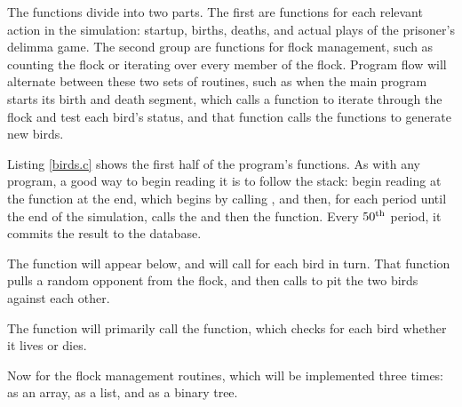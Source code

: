 The functions divide into two parts. The first are functions for
each relevant action in the simulation: startup, births, deaths, and
actual plays of the prisoner's delimma game. The second group are
functions for flock management, such as counting the flock or iterating
over every member of the flock. Program flow will alternate between
these two sets of routines, such as when the main program starts its
birth and death segment, which calls a function to iterate through the
flock and test each bird's status, and that function calls the functions
to generate new birds.


Listing \ref{birds.c} shows the first half of the program's functions.
As with any program, a good way to begin reading
it is to follow the stack: begin reading at the  function at the
end, which begins by calling , and then, for each period until
the end of the simulation, calls the  and then the
 function. Every $50^{\rm th}$ period, it commits the result
to the database.

The  function will appear below, and will call
 for each bird in turn. That function pulls a random
opponent from the flock, and then calls  to pit the
two birds against each other.

The  function will primarily call the 
function, which checks for each bird whether it lives or dies.


Now for the flock management routines, which will be implemented three
times: as an array, as a list, and as a binary tree.

